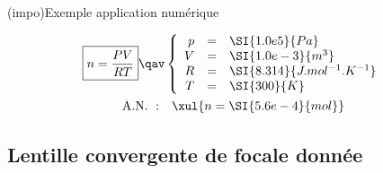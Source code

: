 \documentclass[a4paper, 11pt, garamond, oneside]{book}
\begin{document}
{\begin{tcb}(impo){Exemple application numérique}
	\vspace*{-10pt}
	\begin{minipage}{0.45\linewidth}
		\begin{gather*}
			\boxed{n = \frac{PV}{RT}}
			\qav
			\left\{
			\begin{array}{rcl}
				p & = & \SI{1.0e5}{Pa}                \\
				V & = & \SI{1.0e-3}{m^3}              \\
				R & = & \SI{8.314}{J.mol^{-1}.K^{-1}} \\
				T & = & \SI{300}{K}
			\end{array}
			\right.\\
			\mathrm{A.N.~:}\quad
			\xul{n = \SI{5.6e-4}{mol}}
		\end{gather*}
	\end{minipage}
	\hfill
\end{tcb}
\newpage
}


\subsection{Lentille convergente de focale donnée}
\end{document}

